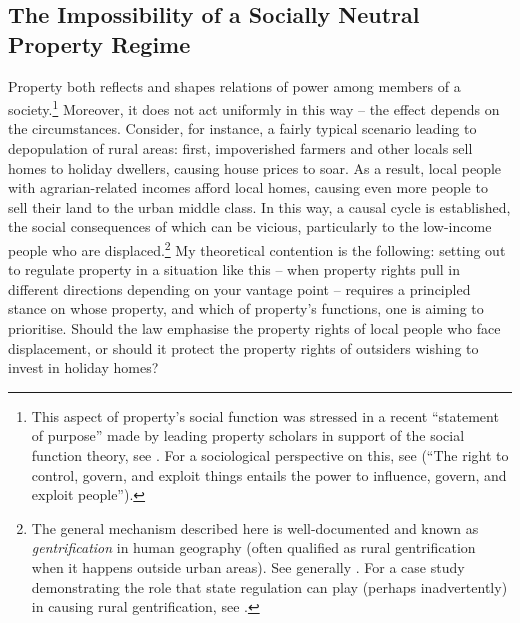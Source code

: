 \subsection{The Impossibility of a Socially Neutral Property Regime}

Property both reflects and shapes relations of power among members of a society.\footnote{This aspect of property's social function was stressed in a recent ``statement of purpose'' made by leading property scholars in support of the social function theory, see \cite{alexander09a}. For a sociological perspective on this, see \cite[23]{carruthers04} (``The right to control, govern, and exploit things entails the power to influence, govern, and exploit people'').} Moreover, it does not act uniformly in this way -- the effect depends on the circumstances.  Consider, for instance, a fairly typical scenario leading to depopulation of rural areas: first, impoverished farmers and other locals sell homes to holiday dwellers, causing house prices to soar. As a result, local people with agrarian-related incomes  afford local homes, causing even more people to sell their land to the urban middle class. In this way, a causal cycle is established, the social consequences of which can be vicious, particularly to the low-income people who are displaced.\footnote{The general mechanism described here is well-documented and known as {\it gentrification} in human geography (often qualified as rural gentrification when it happens outside urban areas). See generally \cite{weesep94,phillips93,slater06}. For a case study demonstrating the role that state regulation can play (perhaps inadvertently) in causing rural gentrification, see \cite[1027-1030]{darling05}.} My theoretical contention is the following: setting out to regulate property in a situation like this -- when property rights pull in different directions depending on your vantage point -- requires a principled stance on whose property, and which of property's functions, one is aiming to prioritise. Should the law emphasise the property rights of local people who face displacement, or should it protect the property rights of outsiders wishing to invest in holiday homes? 

